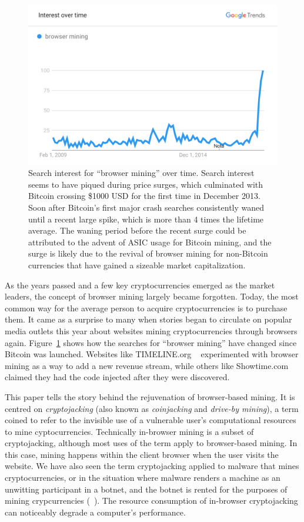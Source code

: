 \begin{figure}[t]
\centering
\includegraphics[width=0.9\linewidth]{figures/browser_mining.png}
\caption{Search interest for ``browser mining'' over time. Search interest seems to have piqued during price surges, which culminated with Bitcoin crossing \$1000 USD for the first time in December 2013. Soon after Bitcoin's first major crash searches consistently waned until a recent large spike, which is more than 4 times the lifetime average. The waning period before the recent surge could be attributed to the advent of ASIC usage for Bitcoin mining, and the surge is likely due to the revival of browser mining for non-Bitcoin currencies that have gained a sizeable market capitalization.\label{fig:interest}}
\end{figure}

As the years passed and a few key cryptocurrencies emerged as the market leaders, the concept of browser mining largely became forgotten. Today, the most common way for the average person to acquire cryptocurrencies is to purchase them. It came as a surprise to many when stories began to circulate on popular media outlets this year about websites mining cryptocurrencies through browsers again. Figure~\ref{fig:interest} shows how the searches for ``browser mining'' have changed since Bitcoin was launched. Websites like TIMELINE.org ~\cite{piratesbayhive} experimented with browser mining as a way to add a new revenue stream, while others like Showtime.com ~\cite{showtimehive} claimed they had the code injected after they were discovered. 

This paper tells the story behind the rejuvenation of browser-based mining. It is centred on \textit{cryptojacking} (also known as \textit{coinjacking} and \textit{drive-by mining}), a term coined to refer to the invisible use of a vulnerable user's computational resources to mine cyptocurrencies. Technically in-browser mining is a subset of cryptojacking, although most uses of the term apply to browser-based mining. In this case, mining happens within the client browser when the user visits the website. We have also seen the term cryptojacking applied to malware that mines cryptocurrencies, or in the situation where malware renders a machine as an unwitting participant in a botnet, and the botnet is rented for the purposes of mining crypcurrencies (\cf~\cite{huang2014botcoin}). The resource consumption of in-browser cryptojacking can noticeably degrade a computer's performance.

